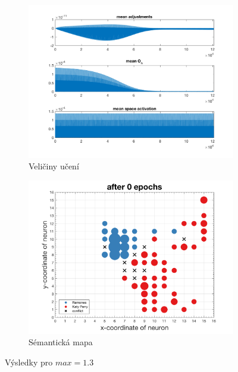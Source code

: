 \documentclass[thesis=M,czech]{FITthesis}[2012/06/26]
\begin{document}
\begin{figure}
\centering
\begin{subfigure}{.5\textwidth}
  \centering
  \includegraphics[width=.99\linewidth]{norm-learnattrs1300.png}
  \caption{Veličiny učení}
  \label{fig:attrs1300}
\end{subfigure}%
\begin{subfigure}{.5\textwidth}
  \centering
  \includegraphics[width=.99\linewidth]{exp_kp_ram_norm_0.png}
  \caption{Sémantická mapa}
  \label{fig:map1300}
\end{subfigure}
\caption{Výsledky pro $max=1.3$}
\label{fig:res1300}
\end{figure}
\end{document}
